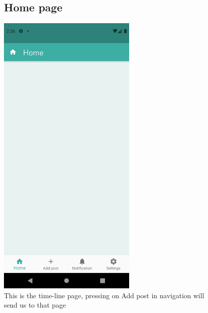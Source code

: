 \documentclass[12pt]{article}
\begin{document}
\begin{figure}[t!]
\vspace{-2cm}
  \subsection*{Home page}
\centerline{\includegraphics[width=0.6\textwidth]{./Screenshots/10.PNG}}
  \caption{This is the time-line page, pressing on Add post in navigation will send us to that page}
  \end{figure}
\end{document}
